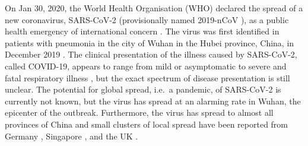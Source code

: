 \documentclass[rmp, reprint, superscriptaddress, floatfix,amsmath]{revtex4-1}
\newcommand{\Robert}[1]{{\color{celestialblue}Robert: #1}}
\newcommand{\Jan}[1]{{\color{deepsaffron}Jan: #1}}
\newcommand{\Emma}[1]{{\color{purple}Emma: #1}}
\begin{document}
On Jan 30, 2020, the World Health Organisation (WHO) declared the spread of a new coronavirus, SARS-CoV-2 (provisionally named 2019-nCoV \citep{ICTV_SARS-CoV-2}), as a public health emergency of international concern \citep{WHO2020}.
The virus was first identified in patients with pneumonia in the city of Wuhan in the Hubei province, China, in December 2019 \citep{Liangjun2020rna}. %
The clinical presentation of the illness caused by SARS-CoV-2, called COVID-19,
appears to range from mild or asymptomatic to severe and fatal respiratory illness \citep{WHO2020situation_report}, but the exact spectrum of disease presentation is still unclear. %
The potential for global spread, i.e.~a pandemic, of SARS-CoV-2 is currently not known, but the virus has spread at an alarming rate in Wuhan, the epicenter of the outbreak. Furthermore, the virus has spread to almost all provinces of China \citep{ECDC_situation_update} and small clusters of local spread have been reported from Germany \citep{rothe2020transmission}, Singapore \citep{MOH_Singapore}, and the UK \citep{WHO_situation_report}.
\end{document}
